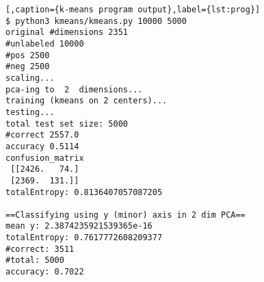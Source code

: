\begin{lstlisting}[,caption={k-means program output},label={lst:prog}]
$ python3 kmeans/kmeans.py 10000 5000
original #dimensions 2351
#unlabeled 10000
#pos 2500
#neg 2500
scaling...
pca-ing to  2  dimensions...
training (kmeans on 2 centers)...
testing...
total test set size: 5000
#correct 2557.0
accuracy 0.5114
confusion_matrix
 [[2426.   74.]
 [2369.  131.]]
totalEntropy: 0.8136407057087205

==Classifying using y (minor) axis in 2 dim PCA==
mean y: 2.3874235921539365e-16
totalEntropy: 0.7617772608209377
#correct: 3511
#total: 5000
accuracy: 0.7022
\end{lstlisting}
